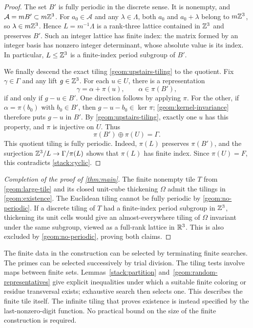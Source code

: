 \begin{proof}
The set $B'$ is fully periodic in the discrete sense.  It is
nonempty, and $\mathcal A=mB'\subset m\mathbb Z^3$.  For $a_0\in\mathcal A$
and any $\lambda\in\Lambda$, both $a_0$ and $a_0+\lambda$ belong to
$m\mathbb Z^3$, so $\lambda\in m\mathbb Z^3$.  Hence
$L=m^{-1}\Lambda$ is a rank-three lattice contained in $\mathbb Z^3$ and
preserves $B'$.  Such an integer lattice has finite index: the
matrix formed by an integer basis has nonzero integer determinant,
whose absolute value is its index.  In particular, $L\leq\mathbb Z^3$ is
a finite-index period subgroup of $B'$.

We finally descend the exact tiling
\eqref{geom:upstairs-tiling} to the quotient.  Fix $\gamma\in\Gamma$
and any lift $g\in\mathbb Z^3$.  For each $u\in U$, there is a
representation
\[
 \gamma=\alpha+\pi(u),\qquad \alpha\in\pi(B'),
\]
if and only if $g-u\in B'$.  One direction follows by applying
$\pi$.  For the other, if $\alpha=\pi(b_0)$ with $b_0\in B'$, then
$g-u-b_0\in\ker\pi$; \cref{geom:kernel-invariance} therefore puts
$g-u$ in $B'$.  By \cref{geom:upstairs-tiling}, exactly one $u$ has
this property, and $\pi$ is injective on $U$.  Thus
\[
 \pi(B')\oplus\pi(U)=\Gamma.
\]
This quotient tiling is fully periodic.  Indeed, $\pi(L)$ preserves
$\pi(B')$, and the surjection
$\mathbb Z^3/L\to\Gamma/\pi(L)$ shows that $\pi(L)$ has finite index.
Since $\pi(U)=F$, this contradicts \cref{stack:cyclic}.
\end{proof}

\begin{proof}[Completion of the proof of \cref{thm:main}]
The finite nonempty tile $T$ from \cref{geom:large-tile} and its
closed unit-cube thickening $\Omega$ admit the tilings in
\cref{geom:existence}.  The Euclidean tiling cannot be fully
periodic by \cref{geom:no-periodic}.  If a discrete tiling of $T$
had a finite-index period subgroup in $\mathbb Z^3$, thickening its unit
cells would give an almost-everywhere tiling of $\Omega$ invariant
under the same subgroup, viewed as a full-rank lattice in $\mathbb R^3$.
This is also excluded by \cref{geom:no-periodic}, proving both
claims.
\end{proof}

\begin{remark}
The finite data in the construction can be selected by terminating
finite searches. The primes can be selected successively by trial division. The tiling
tests involve maps between finite sets. Lemmas~\ref{stack:partition}
and~\ref{geom:random-representatives} give explicit inequalities
under which a suitable finite coloring or residue transversal exists;
exhaustive search then selects one. This describes
the finite tile itself. The infinite tiling that proves existence is
instead specified by the last-nonzero-digit function. No practical bound
on the size of the finite construction is required.
\end{remark}
